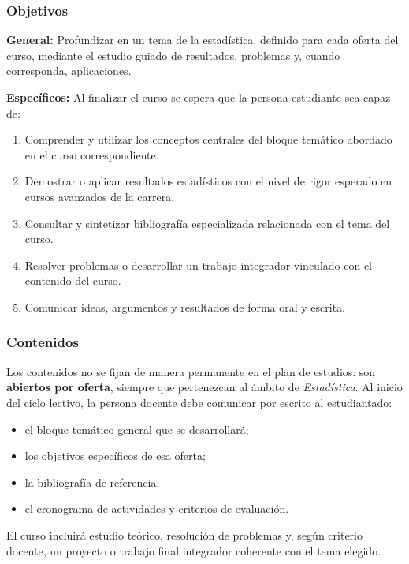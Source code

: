 \begin{refsection}
\subsubsection*{Objetivos}

\textbf{General:} Profundizar en un tema de la estadística, definido para cada oferta del curso, mediante el estudio guiado de resultados, problemas y, cuando corresponda, aplicaciones.

\textbf{Específicos:} Al finalizar el curso se espera que la persona estudiante sea capaz de:

\begin{enumerate}
\item Comprender y utilizar los conceptos centrales del bloque temático abordado en el curso correspondiente.
\item Demostrar o aplicar resultados estadísticos con el nivel de rigor esperado en cursos avanzados de la carrera.
\item Consultar y sintetizar bibliografía especializada relacionada con el tema del curso.
\item Resolver problemas o desarrollar un trabajo integrador vinculado con el contenido del curso.
\item Comunicar ideas, argumentos y resultados de forma oral y escrita.
\end{enumerate}

\subsubsection*{Contenidos}

Los contenidos no se fijan de manera permanente en el plan de estudios: son \textbf{abiertos por oferta}, siempre que pertenezcan al ámbito de \emph{Estadística}. Al inicio del ciclo lectivo, la persona docente debe comunicar por escrito al estudiantado:

\begin{itemize}
\item el bloque temático general que se desarrollará;
\item los objetivos específicos de esa oferta;
\item la bibliografía de referencia;
\item el cronograma de actividades y criterios de evaluación.
\end{itemize}

El curso incluirá estudio teórico, resolución de problemas y, según criterio docente, un proyecto o trabajo final integrador coherente con el tema elegido.


\end{refsection}
